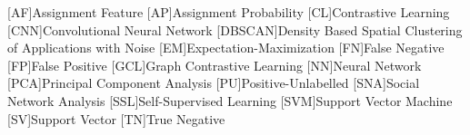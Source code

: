 \begin{acronym}

    [AF]{Assignment Feature}
    [AP]{Assignment Probability}
    [CL]{Contrastive Learning}
    [CNN]{Convolutional Neural Network}
    [DBSCAN]{Density Based Spatial Clustering of Applications with Noise}
    [EM]{Expectation-Maximization}
    [FN]{False Negative}
    [FP]{False Positive}
    [GCL]{Graph Contrastive Learning}
    [NN]{Neural Network}
    [PCA]{Principal Component Analysis}
    [PU]{Positive-Unlabelled}
    [SNA]{Social Network Analysis}    
    [SSL]{Self-Supervised Learning}
    [SVM]{Support Vector Machine}
    [SV]{Support Vector}
    [TN]{True Negative}

\end{acronym}